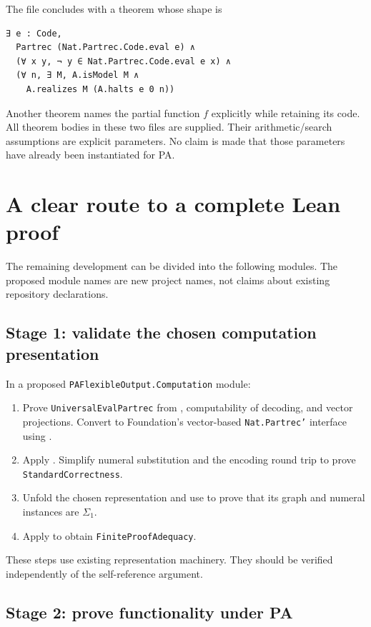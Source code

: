 \documentclass[11pt]{article}
\theoremstyle{definition}
\theoremstyle{remark}
\begin{document}
The file concludes with a theorem whose shape is
\begin{lstlisting}
∃ e : Code,
  Partrec (Nat.Partrec.Code.eval e) ∧
  (∀ x y, ¬ y ∈ Nat.Partrec.Code.eval e x) ∧
  (∀ n, ∃ M, A.isModel M ∧
    A.realizes M (A.halts e 0 n))
\end{lstlisting}
Another theorem names the partial function $f$ explicitly while retaining
its code. All theorem bodies in these two files are supplied. Their
arithmetic/search assumptions are explicit parameters. No claim is made
that those parameters have already been instantiated for PA.

\section{A clear route to a complete Lean proof}

The remaining development can be divided into the following modules. The
proposed module names are new project names, not claims about existing
repository declarations.

\subsection{Stage 1: validate the chosen computation presentation}

In a proposed \texttt{PAFlexibleOutput.Computation} module:
\begin{enumerate}
 \item Prove \texttt{UniversalEvalPartrec} from ,
       computability of decoding, and vector projections. Convert to
       Foundation's vector-based \texttt{Nat.Partrec'} interface using
       .
 \item Apply . Simplify numeral substitution
       and the encoding round trip to prove
       \texttt{StandardCorrectness}.
 \item Unfold the chosen representation and use
        to prove that its graph and numeral
       instances are $\Sigma_1$.
 \item Apply  to obtain
       \texttt{FiniteProofAdequacy}.
\end{enumerate}
These steps use existing representation machinery. They should be
verified independently of the self-reference argument.

\subsection{Stage 2: prove functionality under PA}
\end{document}
